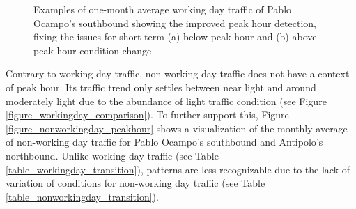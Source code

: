 \begin{figure}[!t] 
\centering
    \centering
      \captionsetup{justification=centering}
    \hfill
    \caption{Examples of one-month average working day traffic of Pablo Ocampo’s southbound showing the improved peak hour detection, fixing the issues for short-term (a) below-peak hour and (b) above-peak hour condition change}

    \label{figure_peakhour_solution}
\end{figure}



Contrary to working day traffic, non-working day traffic does not have a context of peak hour. Its traffic trend only settles between near light and around moderately light due to the abundance of light traffic condition (see Figure \ref{figure_workingday_comparison}). To further support this, Figure \ref{figure_nonworkingday_peakhour} shows a visualization of the monthly average of non-working day traffic for Pablo Ocampo’s southbound and Antipolo’s northbound. Unlike working day traffic (see Table \ref{table_workingday_transition}), patterns are less recognizable due to the lack of variation of conditions for non-working day traffic (see Table \ref{table_nonworkingday_transition}).

